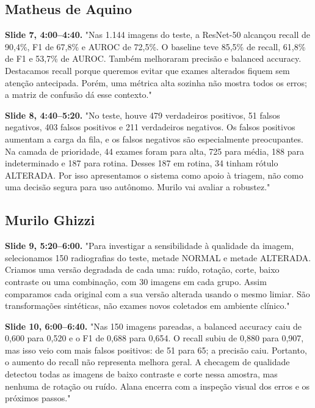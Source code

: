 \documentclass[11pt,a4paper]{article}
\begin{document}
\subsection*{Matheus de Aquino}

\textbf{Slide 7, 4:00--4:40.} "Nas 1.144 imagens do teste, a ResNet-50 alcançou recall de 90,4\%, F1 de 67,8\% e AUROC de 72,5\%. O baseline teve 85,5\% de recall, 61,8\% de F1 e 53,7\% de AUROC. Também melhoraram precisão e balanced accuracy. Destacamos recall porque queremos evitar que exames alterados fiquem sem atenção antecipada. Porém, uma métrica alta sozinha não mostra todos os erros; a matriz de confusão dá esse contexto."\par

\textbf{Slide 8, 4:40--5:20.} "No teste, houve 479 verdadeiros positivos, 51 falsos negativos, 403 falsos positivos e 211 verdadeiros negativos. Os falsos positivos aumentam a carga da fila, e os falsos negativos são especialmente preocupantes. Na camada de prioridade, 44 exames foram para alta, 725 para média, 188 para indeterminado e 187 para rotina. Desses 187 em rotina, 34 tinham rótulo ALTERADA. Por isso apresentamos o sistema como apoio à triagem, não como uma decisão segura para uso autônomo. Murilo vai avaliar a robustez."\par

\subsection*{Murilo Ghizzi}

\textbf{Slide 9, 5:20--6:00.} "Para investigar a sensibilidade à qualidade da imagem, selecionamos 150 radiografias do teste, metade NORMAL e metade ALTERADA. Criamos uma versão degradada de cada uma: ruído, rotação, corte, baixo contraste ou uma combinação, com 30 imagens em cada grupo. Assim comparamos cada original com a sua versão alterada usando o mesmo limiar. São transformações sintéticas, não exames novos coletados em ambiente clínico."\par

\textbf{Slide 10, 6:00--6:40.} "Nas 150 imagens pareadas, a balanced accuracy caiu de 0,600 para 0,520 e o F1 de 0,688 para 0,654. O recall subiu de 0,880 para 0,907, mas isso veio com mais falsos positivos: de 51 para 65; a precisão caiu. Portanto, o aumento do recall não representa melhora geral. A checagem de qualidade detectou todas as imagens de baixo contraste e corte nessa amostra, mas nenhuma de rotação ou ruído. Alana encerra com a inspeção visual dos erros e os próximos passos."\par
\end{document}

